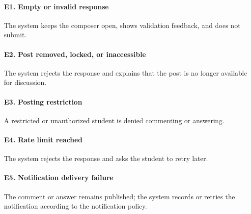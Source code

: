 \documentclass[12pt]{article}
\begin{document}
\hypertarget{sec:e1-empty-or-invalid-response}{}
\paragraph*{E1. Empty or invalid response}
\par\medskip

The system keeps the composer open, shows validation feedback, and does not submit.
\par\medskip

\hypertarget{sec:e2-post-removed-locked-or-inaccessible}{}
\paragraph*{E2. Post removed, locked, or inaccessible}
\par\medskip

The system rejects the response and explains that the post is no longer available for discussion.
\par\medskip

\hypertarget{sec:e3-posting-restriction}{}
\paragraph*{E3. Posting restriction}
\par\medskip

A restricted or unauthorized student is denied commenting or answering.
\par\medskip

\hypertarget{sec:e4-rate-limit-reached}{}
\paragraph*{E4. Rate limit reached}
\par\medskip

The system rejects the response and asks the student to retry later.
\par\medskip

\hypertarget{sec:e5-notification-delivery-failure}{}
\paragraph*{E5. Notification delivery failure}
\par\medskip

The comment or answer remains published; the system records or retries the notification according to the notification policy.
\par\medskip
\end{document}
